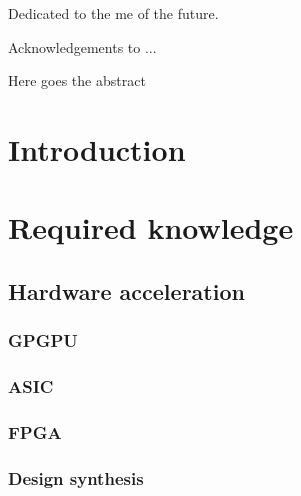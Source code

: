 \documentclass{iccmemoria}
\author{Erik Regla}
\date{month, year}
\begin{document}
\maketitle

\begin{dedicatory}
Dedicated to the me of the future. %
\end{dedicatory}

\begin{acknowledgment}
Acknowledgements to ...
\end{acknowledgment}

\tableofcontents
\listoffigures
\listoftables

\begin{resumen}
Here goes the abstract
\end{resumen}



\chapter{Introduction}
  

\chapter{Required knowledge}
  
  
  
  \section{Hardware acceleration}
    \subsection{GPGPU}
    \subsection{ASIC}
    \subsection{FPGA}
    \subsection{Design synthesis}
\end{document}
